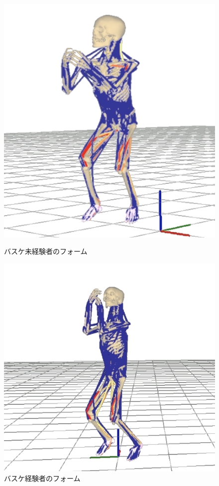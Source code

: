 \documentclass{jsarticle}
\begin{document}
        \begin{figure}[h]
            \begin{minipage}{0.5\hsize}
                \centering
                \includegraphics[width=0.9\hsize]{img/fujita.png}
                \caption{バスケ未経験者のフォーム}
                \label{fig:fujita}
            \end{minipage}
            \begin{minipage}{0.5\hsize}
                \centering
                \includegraphics[width=0.9\hsize]{img/shuhei.png}
                \caption{バスケ経験者のフォーム}
                \label{fig:shuhei}
            \end{minipage}
        \end{figure}
\end{document}
